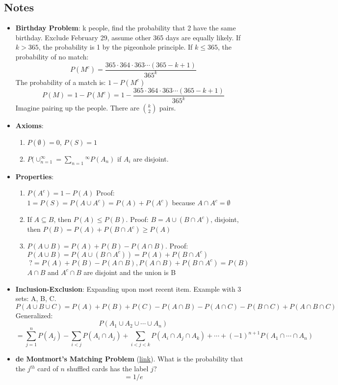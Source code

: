 \documentclass[11pt, oneside]{article}   	%
\begin{document}
	\subsection{Notes}
	\begin{itemize}
		\item \textbf{Birthday Problem}: k people, find the probability that 2 have the same birthday. Exclude February 29, assume other 365 days are equally likely.
			If $k > 365$, the probability is 1 by the pigeonhole principle.
			If $k \leq 365$, the probability of no match:
				\[
					P(M^c)= \frac{365 \cdot 364 \cdot 363 \cdots (365 - k + 1)}{365^k}
				\]
			The probability of a match is: $1 - P(M^c)$
				\[
					P(M) = 1 - P(M^c) = 1 - \frac{365 \cdot 364 \cdot 363 \cdots (365 - k + 1)}{365^k}
				\]
			Imagine pairing up the people. There are $\binom{k}{2}$ pairs.
		\item \textbf{Axioms}:
			\begin{enumerate}
				\item $P(\emptyset) = 0$, $P(S) = 1$
				\item $P( \cup_{n=1}^{\infty} = \sum_{n=1}{^\infty}P(A_n)$ if $A_i$ are disjoint.
			\end{enumerate}
		\item \textbf{Properties}:
			\begin{enumerate}
				\item $P(A^c) = 1 - P(A)$ Proof: $1 = P(S) = P(A \cup A^c) = P(A) + P(A^c)$ because $A \cap A^c = \emptyset$
				\item If $ A \subseteq B$, then $P(A) \leq P(B)$. Proof: $B = A \cup (B \cap A^c)$, disjoint, then $P(B) = P(A) + P(B \cap A^c) \geq P(A)$
				\item $P(A \cup B) = P(A) + P(B) - P(A \cap B)$. Proof: $P(A \cup B) = P(A \cup ( B \cap A^c )) = P(A) + P(B \cap A^c)$
					\[
					 	?= P(A) + P(B) - P(A \cap B), P(A \cap B) + P(B \cap A^c) = P(B)
					\]
					$A \cap B$ and $A^c \cap B$ are disjoint and the union is B
			\end{enumerate}
		\item \textbf{Inclusion-Exclusion}: Expanding upon most recent item. Example with 3 sets: A, B, C.
			\[
				P(A \cup B \cup C) = P(A) + P(B) + P(C) - P(A \cap B) - P(A \cap C) - P(B \cap C) + P(A \cap B \cap C)
			\]
			Generalized:
			\[
				P(A_1 \cup A_2 \cup \cdots \cup A_n)
			\]
			\[
				= \sum_{j=1}^{n}P(A_j) - \sum_{i < j}P(A_i \cap A_j) + \sum_{i < j < k}P(A_i \cap A_j \cap A_k) + \cdots + (-1)^{n+1}P(A_1 \cap \cdots \cap A_n)
			\]
		\item \textbf{de Montmort's Matching Problem} (\href{http://www.math.uah.edu/stat/urn/Matching.html}{link}).
			What is the probability that the $j^{th}$ card of $n$ shuffled cards has the label $j$?
			\[
				= 1/e
			\]
	\end{itemize}
\break
\end{document}
